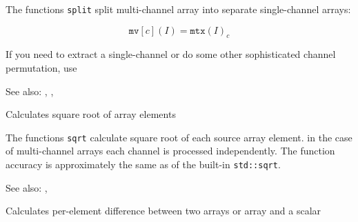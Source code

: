 The functions \texttt{split} split multi-channel array into separate single-channel arrays:

\[ \texttt{mv}[c](I) = \texttt{mtx}(I)_c \]

If you need to extract a single-channel or do some other sophisticated channel permutation, use 

See also: , , 

Calculates square root of array elements

\begin{description}
\end{description}

The functions \texttt{sqrt} calculate square root of each source array element. in the case of multi-channel arrays each channel is processed independently. The function accuracy is approximately the same as of the built-in \texttt{std::sqrt}.

See also: , 

Calculates per-element difference between two arrays or array and a scalar

